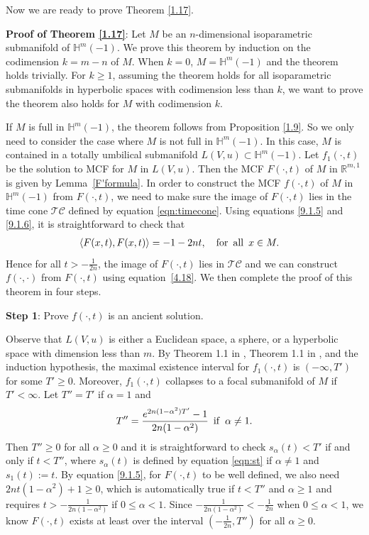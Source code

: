 \documentclass[12pt]{article}
\begin{document}
Now we are ready to prove Theorem \ref{1.17}.
	
	
\noindent
{\bf Proof of Theorem \ref{1.17}}:
Let $M$ be an $n$-dimensional isoparametric submanifold of $\mathbb{H}^{m}(-1)$. We prove this
theorem by induction on the codimension $k=m-n$ of $M$.
When $k=0$, $M=\mathbb{H}^{m}(-1)$ and the theorem holds trivially.
For $k \geq 1$, assuming the theorem holds for all isoparametric submanifolds in hyperbolic spaces
with codimension less than $k$, we want to prove the theorem also holds for $M$ with codimension $k$.

If $M$ is full in $\mathbb{H}^{m}(-1)$, the theorem follows from Proposition \ref{1.9}.
So we only need to consider the case where $M$ is not full in $\mathbb{H}^{m}(-1)$.
In this case,  $M$ is contained in a totally umbilical submanifold $L(V, u) \subset\mathbb H^{m}(-1) $.
Let $f_1(\cdot,t)$  be the solution to  MCF for $M$ in $L(V,u)$. Then the MCF $F(\cdot, t)$ of $M$ in $\mathbb R^{m,1}$
is given by Lemma~\ref{F'formula}.
In order to construct the MCF $f(\cdot,t)$  of $M$ in $\mathbb{H}^{m}(-1)$ from $F(\cdot, t)$, we need to make sure the image of
$F(\cdot ,t)$ lies in the time cone $\mathcal{TC}$ defined by equation \eqref{eqn:timecone}.
Using equations \eqref{9.1.5} and \eqref{9.1.6}, it is straightforward to check that
\begin{align*}
\left<F(x,t), F(x,t)\right>
		 	&=-1-2nt, \hspace{10pt} {\rm for \,\,\, all \,\,\,} x \in M.
\end{align*}
Hence for all $t > -\frac{1}{2n}$, the image of $F(\cdot,t)$ lies in $\mathcal{TC}$ and
we can construct $f(\cdot,\cdot)$ from $F(\cdot, t)$ using equation~\eqref{4.18}.
We then complete the proof of this theorem in four steps.

{\bf Step 1}: Prove $f(\cdot, t)$ is an ancient solution.

Observe that $L(V,u)$ is either a Euclidean space, a sphere,
or a hyperbolic space with dimension less than $m$.
By Theorem 1.1  in \cite{X.C}, Theorem 1.1 in \cite{X.CT}, and the induction hypothesis, the maximal existence interval for $f_1(\cdot, t)$ is $(-\infty, T')$ for some $T' \geq 0$. Moreover,
$f_1(\cdot, t)$ collapses to a focal submanifold of $M$ if $T' < \infty$.
Let $T''=T'$ if $\alpha=1$ and
\begin{equation} \label{eqn:T''}
 T'' =\frac{e^{2n(1-\alpha^2)T'}-1}{2n(1-\alpha^2)}  {\rm \,\,\, if \,\,\, } \alpha \neq 1.
\end{equation}
Then $T''\geq 0$ for all $\alpha\geq 0$ and
it is straightforward to check $s_\alpha(t) < T'$ if and only if $t < T''$, where $s_{\alpha}(t)$ is defined by
equation \eqref{eqn:st} if $\alpha \neq 1$ and $s_1(t) := t$. By equation \eqref{9.1.5}, for $F(\cdot, t)$ to be well defined,
we also need $2nt(1-\alpha^2)+1 \geq 0$, which is automatically true if $t < T''$ and $\alpha \geq 1$ and requires
$t > - \frac{1}{2n(1-\alpha^2)}$ if $0 \leq \alpha < 1$.
Since $- \frac{1}{2n(1-\alpha^2)} < - \frac{1}{2n}$ when $0 \leq \alpha < 1$,
we know $F(\cdot, t)$ exists at least over the interval $(- \frac{1}{2n}, T'')$ for all $\alpha \geq 0$.
\end{document}
